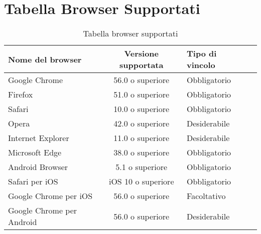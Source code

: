 \section{Tabella Browser Supportati}
\label{Tabella browser supportati}
\begin{table}[htbp]
	\begin{center}
		\setlength{\extrarowheight}{\jot}
		\begin{tabular}{|p{4cm}|c|p{2.5cm}|p{2.5cm}|}
			\hline
			\textbf{Nome del browser} & \textbf{Versione supportata} & \textbf{Tipo di vincolo}\\[1ex]
			\hline
			Google Chrome & 56.0 o superiore & Obbligatorio\\[1ex]
			\hline
			Firefox & 51.0 o superiore & Obbligatorio\\[1ex]
			\hline
			Safari & 10.0 o superiore & Obbligatorio\\[1ex]
			\hline
			Opera & 42.0 o superiore & Desiderabile\\[1ex]
			\hline
			Internet Explorer & 11.0 o superiore & Desiderabile \\[1ex]
			\hline
			Microsoft Edge & 38.0 o superiore & Obbligatorio \\[1ex]
			\hline
			Android Browser & 5.1 o superiore & Obbligatorio \\[1ex]
			\hline
			Safari per iOS & iOS 10 o superiore & Obbligatorio \\[1ex]
			\hline
			Google Chrome per iOS & 56.0 o superiore & Facoltativo\\[1ex]
			\hline
			Google Chrome per Android & 56.0 o superiore & Desiderabile\\[1ex]
			\hline
		\end{tabular}
	\end{center}
	\caption{Tabella browser supportati}
\end{table}
